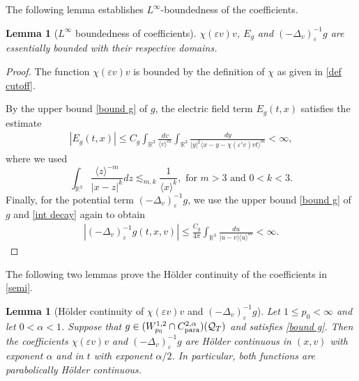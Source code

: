 \documentclass[reqno,11pt,final]{amsart}
\theoremstyle{plain}
\newtheorem{lemma}[theorem]{Lemma}
\numberwithin{equation}{section}
\numberwithin{theorem}{section}
\begin{document}
The following lemma establishes $L^\infty$-boundedness of the coefficients.
\begin{lemma}[$L^\infty$ boundedness of coefficients]
    \label{L^infty bound of coefficients}$\chi(\varepsilon v)v$, $E_g$ and $(-\Delta_v)_\varepsilon^{-1}g$ are essentially bounded with their respective domains.
\end{lemma}

\begin{proof}
The function $\chi(\varepsilon v)v$ is bounded by the definition of $\chi$ as given in \eqref{def cutoff}.

By the upper bound \eqref{bound g} of $g$, the electric field term $E_g(t,x)$ satisfies the estimate
\begin{align*}
|E_g(t,x)| \le C_g\int_{\mathbb{R}^3} \frac{dv}{\langle v\rangle^m}\int_{\mathbb{R}^3} \frac{dy}{|y|^2\langle x-y-\chi(\varepsilon'v)vt\rangle^m} <\infty,
\end{align*}where we used 
\begin{equation}\label{int decay}
    \int_{\mathbb{R}^3}\frac{\langle z\rangle^{-m}}{|x-z|^k}dz \lesssim_{m,k} \frac{1}{\langle x\rangle^k}, \text{ for }m>3\text{ and }0<k<3.
\end{equation}
Finally, for the potential term $(-\Delta_v)_\varepsilon^{-1}g$, we use the upper bound \eqref{bound g} of $g$ and \eqref{int decay} again to obtain
\begin{align*}
|(-\Delta_v)_\varepsilon^{-1}g(t,x,v)| \le \frac{C_g}{4\pi} \int_{\mathbb{R}^3} \frac{du}{|u-v|\langle u\rangle^m}<\infty.
\end{align*}
\end{proof}

The following two lemmas prove the H\"older continuity of the coefficients in \eqref{semi}.


\begin{lemma}[H\"older continuity of $\chi(\varepsilon v)v$ and $(-\Delta_v)_\varepsilon^{-1}g$] \label{lem.Hold.cont}
Let $1\le p_0<\infty$ and let $0<\alpha<1$. Suppose that $g\in (W_{p_0}^{1,2}\cap C_\textup{para}^{2,\alpha})(\mathcal{Q}_T)$ and satisfies \eqref{bound g}. Then the coefficients $\chi(\varepsilon v)v$ and $(-\Delta_v)_\varepsilon^{-1}g$ are H\"older continuous in $(x,v)$ with exponent $\alpha$ and in $t$ with exponent $\alpha/2$. %
In particular, both functions are parabolically H\"older continuous.
\end{lemma}
\end{document}
